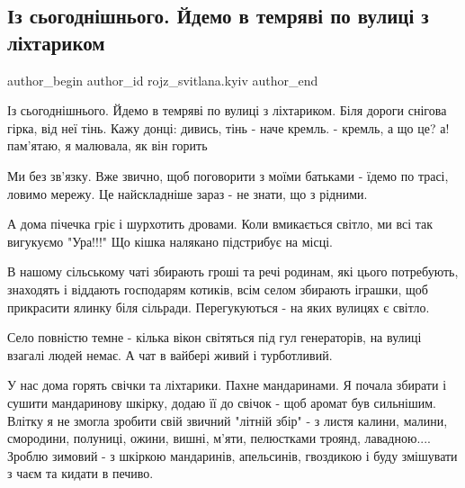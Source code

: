  
 
 
 
 
 
\subsection{Із сьогоднішнього. Йдемо в темряві по вулиці з ліхтариком}
\label{sec:21_12_2022.fb.rojz_svitlana.kyiv.1.vulycja_lihtaryk}
 
\ifcmt
 author_begin
   author_id rojz_svitlana.kyiv
 author_end
\fi

Із сьогоднішнього. Йдемо в темряві по вулиці з ліхтариком. Біля дороги снігова
гірка, від неї тінь. Кажу донці: дивись, тінь - наче кремль. - кремль, а що це?
а! пам'ятаю, я малювала, як він горить 🙂 

Ми без зв'язку. Вже звично, щоб поговорити з моїми батьками - їдемо по трасі,
ловимо мережу. Це найскладніше зараз - не знати, що з рідними.

А дома пічечка гріє і шурхотить дровами. Коли вмикається світло, ми всі так
вигукуємо "Ура!!!" Що кішка налякано підстрибує на місці. 

В нашому сільському чаті збирають гроші та речі родинам, які цього потребують,
знаходять і віддають господарям котиків, всім селом збирають іграшки, щоб
прикрасити ялинку біля сільради. Перегукуються - на яких вулицях є світло. 

Село повністю темне - кілька вікон світяться під гул генераторів, на вулиці
взагалі людей немає. А чат в вайбері живий і турботливий. 

У нас дома горять свічки та ліхтарики. Пахне мандаринами. Я почала збирати і
сушити мандаринову шкірку, додаю її до свічок - щоб аромат був сильнішим.
Влітку я не змогла зробити свій звичний "літній збір" - з листя калини, малини,
смородини, полуниці, ожини, вишні, м'яти, пелюстками троянд, лавадною....
Зроблю зимовий - з шкіркою мандаринів, апельсинів, гвоздикою і буду змішувати з
чаєм та кидати в печиво. 

